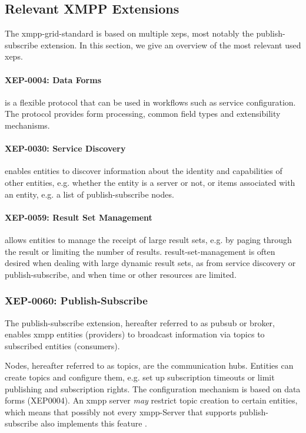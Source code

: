 \subsection{Relevant XMPP Extensions}

The \gls{xmpp-grid-standard} is based on multiple \glspl{xep}, most notably the \gls{publish-subscribe} extension. In this section, we give an overview of the most relevant used \glspl{xep}.

\paragraph{XEP-0004: Data Forms} is a flexible protocol that can be used in workflows such as service configuration.
The protocol provides form processing, common field types and extensibility mechanisms.~\cite{xep-0004}

\paragraph{XEP-0030: Service Discovery} enables entities to discover information about the identity and capabilities of other entities, e.g. whether the entity is a server or not, or items associated with an entity, e.g. a list of \gls{publish-subscribe} nodes.~\cite{xep-0030}

\paragraph{XEP-0059: Result Set Management} allows entities to manage the receipt of large result sets, e.g. by paging through the result or limiting the number of results. \gls{result-set-management} is often desired when dealing with large dynamic result sets, as from service discovery or publish-subscribe, and when time or other resources are limited.~\cite{xep-0059}

\subsubsection{XEP-0060: Publish-Subscribe}
The \gls{publish-subscribe} extension, hereafter referred to as \gls{pubsub} or \gls{broker}, enables \gls{xmpp} entities (\glspl{provider}) to broadcast information via \glspl{topic} to subscribed entities (\glspl{consumer}).~\cite{xep-0060}

Nodes, hereafter referred to as \glspl{topic}, are the communication hubs. Entities can create \glspl{topic} and configure them, e.g. set up subscription timeouts or limit publishing and subscription rights. The configuration mechanism is based on data forms (XEP0004).
An \gls{xmpp} server \emph{may} restrict \gls{topic} creation to certain entities, which means that possibly not every \gls{xmpp}-Server that supports \gls{publish-subscribe} also implements this feature \cite{rfc2119}.

